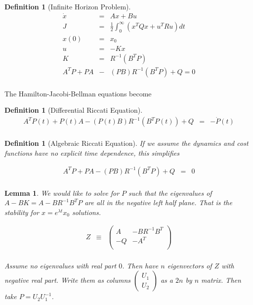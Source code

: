 \documentclass[a4paper,landscape]{article}
\theoremstyle{change}
\newtheorem{definition}[equation]{Definition}
\newtheorem{lemma}[equation]{Lemma}
\theoremstyle{nonumberplain}
\numberwithin{equation}{section}
\begin{document}
\begin{definition}[Infinite Horizon Problem]
\begin{eqnarray*}
\dot{x} &=& Ax + Bu\\
J &=& \frac{1}{2} \int_{0}^{\infty} ( x^T Q x + u^T R u  ) dt\\
x (0 ) &=& x_0\\
u &=& - K x\\
K &=& R^{-1} ( B^T P  )\\
A^T P + P A &-& ( P B ) R^{-1} ( B^T P ) + Q = 0\\
\end{eqnarray*}
\end{definition}

The Hamilton-Jacobi-Bellman equations become

\begin{definition}[Differential Riccati Equation]
\begin{eqnarray*}
A^T P(t) + P(t) A - ( P(t) B ) R^{-1} ( B^T P(t) ) + Q &=& - \dot{P} (t)\\
\end{eqnarray*}
\end{definition}

\begin{definition}[Algebraic Riccati Equation]

If we assume the dynamics and cost functions have no explicit time dependence, this simplifies

\begin{eqnarray*}
A^T P + P A - ( P B ) R^{-1} ( B^T P ) + Q &=& 0\\
\end{eqnarray*}
\end{definition}

\begin{lemma}

We would like to solve for $P$ such that the eigenvalues of $A-BK=A-BR^{-1} B^T P$ are all in the negative left half plane. That is the stability for $x = e^{\lambda t} x_0$ solutions.

\begin{eqnarray*}
Z &\equiv& \begin{pmatrix}
A & -BR^{-1}B^T\\
-Q & -A^T\\
\end{pmatrix}\\
\end{eqnarray*}

Assume no eigenvalues with real part $0$. Then have $n$ eigenvectors of $Z$ with negative real part. Write them as columns $\begin{pmatrix}U_1\\U_2\end{pmatrix}$ as a $2n$ by $n$ matrix. Then take $P=U_2 U_1^{-1}$.

\end{lemma}
\end{document}
